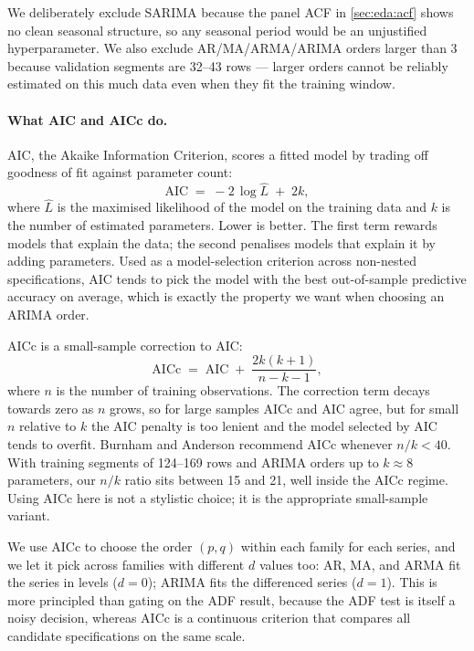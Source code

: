 We deliberately exclude SARIMA because the panel ACF in \cref{sec:eda:acf} shows no clean seasonal structure, so any seasonal period would be an unjustified hyperparameter. We also exclude AR/MA/ARMA/ARIMA orders larger than 3 because validation segments are 32--43 rows --- larger orders cannot be reliably estimated on this much data even when they fit the training window.

\paragraph{What AIC and AICc do.}
AIC, the Akaike Information Criterion, scores a fitted model by trading off goodness of fit against parameter count:
\begin{equation}
\label{eq:aic}
\mathrm{AIC} \;=\; -2 \, \log \hat L \;+\; 2k,
\end{equation}
where $\hat L$ is the maximised likelihood of the model on the training data and $k$ is the number of estimated parameters. Lower is better. The first term rewards models that explain the data; the second penalises models that explain it by adding parameters. Used as a model-selection criterion across non-nested specifications, AIC tends to pick the model with the best out-of-sample predictive accuracy on average, which is exactly the property we want when choosing an ARIMA order.

AICc is a small-sample correction to AIC:
\begin{equation}
\label{eq:aicc}
\mathrm{AICc} \;=\; \mathrm{AIC} \;+\; \dfrac{2k(k+1)}{n-k-1},
\end{equation}
where $n$ is the number of training observations. The correction term decays towards zero as $n$ grows, so for large samples AICc and AIC agree, but for small $n$ relative to $k$ the AIC penalty is too lenient and the model selected by AIC tends to overfit. Burnham and Anderson recommend AICc whenever $n / k < 40$. With training segments of 124--169 rows and ARIMA orders up to $k \approx 8$ parameters, our $n/k$ ratio sits between 15 and 21, well inside the AICc regime. Using AICc here is not a stylistic choice; it is the appropriate small-sample variant.

We use AICc to choose the order $(p, q)$ within each family for each series, and we let it pick across families with different $d$ values too: AR, MA, and ARMA fit the series in levels ($d=0$); ARIMA fits the differenced series ($d=1$). This is more principled than gating on the ADF result, because the ADF test is itself a noisy decision, whereas AICc is a continuous criterion that compares all candidate specifications on the same scale.

